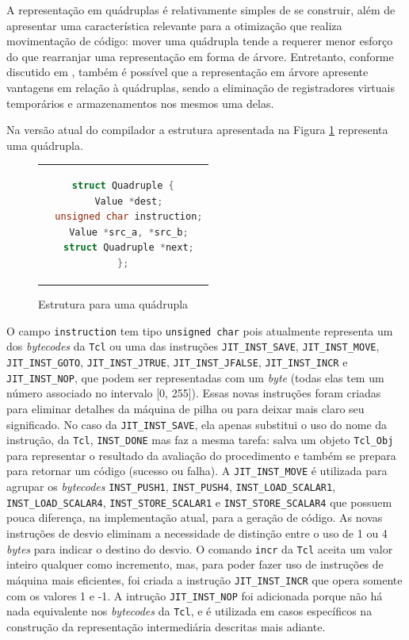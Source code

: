 A representação em quádruplas é relativamente simples de se construir,
além de apresentar uma característica relevante para a otimização que
realiza movimentação de código: mover uma quádrupla tende a requerer
menor esforço do que rearranjar uma representação em forma de
árvore. Entretanto, conforme discutido em ,
também é possível que a representação em árvore apresente vantagens
em relação à quádruplas, sendo a eliminação de registradores virtuais
temporários e armazenamentos nos mesmos uma delas.

Na versão atual do compilador a estrutura apresentada na Figura
\ref{quad-struct} representa uma quádrupla.

\begin{figure}[h]
  \centering
  \begin{tabular}{c}
    \begin{lstlisting}[language=C]
struct Quadruple {
  Value *dest;
  unsigned char instruction;
  Value *src_a, *src_b;
  struct Quadruple *next;
};
     \end{lstlisting}
   \end{tabular}
  \caption{Estrutura para uma quádrupla\label{quad-struct}}
\end{figure}

O campo \verb!instruction! tem tipo \verb!unsigned char! pois atualmente
representa um dos \textit{bytecodes} da \texttt{Tcl} ou uma das
instruções \verb!JIT_INST_SAVE!, \verb!JIT_INST_MOVE!, %
\verb!JIT_INST_GOTO!, \verb!JIT_INST_JTRUE!, \verb!JIT_INST_JFALSE!,
\verb!JIT_INST_INCR! e \verb!JIT_INST_NOP!,
que podem ser representadas com um
\textit{byte} (todas elas tem um número associado no intervalo [0, 255]). Essas
novas instruções foram criadas para eliminar detalhes da máquina de
pilha ou para deixar mais claro seu significado. No caso da
\verb!JIT_INST_SAVE!, ela apenas substitui o uso do nome da instrução, da
\texttt{Tcl}, \verb!INST_DONE! mas faz a mesma tarefa:
salva um objeto \verb!Tcl_Obj! para representar o resultado da
avaliação do procedimento e também se prepara para retornar um código
(sucesso ou falha). A \verb!JIT_INST_MOVE! é utilizada para agrupar os
\textit{bytecodes} \verb!INST_PUSH1!, \verb!INST_PUSH4!,
\verb!INST_LOAD_SCALAR1!, \verb!INST_LOAD_SCALAR4!,
\verb!INST_STORE_SCALAR1! e \verb!INST_STORE_SCALAR4! que possuem
pouca diferença, na implementação atual, para a geração de código.
As novas instruções de desvio eliminam a
necessidade de distinção entre o uso de 1 ou 4 \textit{bytes} para
indicar o destino do desvio. O comando \verb!incr! da \texttt{Tcl}
aceita um valor inteiro qualquer como incremento, mas, para poder fazer uso
de instruções de máquina mais eficientes, foi criada a instrução
\verb!JIT_INST_INCR! que opera somente com os valores 1 e -1.
A intrução \verb!JIT_INST_NOP! foi adicionada
porque não há nada equivalente nos \textit{bytecodes} da \texttt{Tcl},
e é utilizada em casos específicos na construção da representação
intermediária descritas mais adiante.

